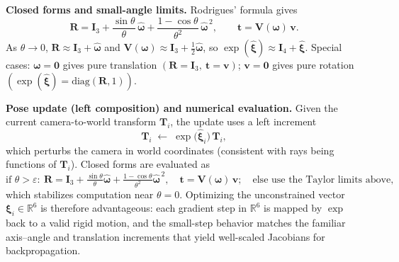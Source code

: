 \begin{enrichment}
\begin{enrichment}
        \textbf{Closed forms and small-angle limits.}
        Rodrigues’ formula gives
        \[
        \mathbf{R}
        =\mathbf{I}_3
        + \frac{\sin\theta}{\theta}\,\widehat{\boldsymbol{\omega}}
        + \frac{1-\cos\theta}{\theta^2}\,\widehat{\boldsymbol{\omega}}^{\,2},
        \qquad
        \mathbf{t}=\mathbf{V}(\boldsymbol{\omega})\,\mathbf{v}.
        \]
        As \(\theta\to 0\),
        \(\mathbf{R}\approx \mathbf{I}_3+\widehat{\boldsymbol{\omega}}\) and
        \(\mathbf{V}(\boldsymbol{\omega})\approx \mathbf{I}_3+\tfrac{1}{2}\widehat{\boldsymbol{\omega}}\),
        so \(\exp(\widehat{\boldsymbol{\xi}})\approx \mathbf{I}_4+\widehat{\boldsymbol{\xi}}\).
        Special cases: \(\boldsymbol{\omega}=\mathbf{0}\) gives pure translation \((\mathbf{R}=\mathbf{I}_3,\ \mathbf{t}=\mathbf{v})\); \(\mathbf{v}=\mathbf{0}\) gives pure rotation \((\exp(\widehat{\boldsymbol{\xi}})=\mathrm{diag}(\mathbf{R},1))\).
        
        \textbf{Pose update (left composition) and numerical evaluation.}
        Given the current camera-to-world transform \(\mathbf{T}_i\), the update uses a left increment
        \[
        \mathbf{T}_i \;\leftarrow\; \exp\!\big(\widehat{\boldsymbol{\xi}}_i\big)\,\mathbf{T}_i,
        \]
        which perturbs the camera in world coordinates (consistent with rays being functions of \(\mathbf{T}_i\)).  
        Closed forms are evaluated as
        \[
        \text{if }\theta>\varepsilon:\ 
        \mathbf{R}=\mathbf{I}_3+\tfrac{\sin\theta}{\theta}\widehat{\boldsymbol{\omega}}
        +\tfrac{1-\cos\theta}{\theta^2}\widehat{\boldsymbol{\omega}}^{\,2},
        \quad
        \mathbf{t}=\mathbf{V}(\boldsymbol{\omega})\,\mathbf{v};
        \quad
        \text{else use the Taylor limits above,}
        \]
        which stabilizes computation near \(\theta=0\).  
        Optimizing the unconstrained vector \(\boldsymbol{\xi}_i\in\mathbb{R}^6\) is therefore advantageous: each gradient step in \(\mathbb{R}^6\) is mapped by \(\exp\) back to a valid rigid motion, and the small-step behavior matches the familiar axis–angle and translation increments that yield well-scaled Jacobians for backpropagation.
        

\end{enrichment}
\end{enrichment}
